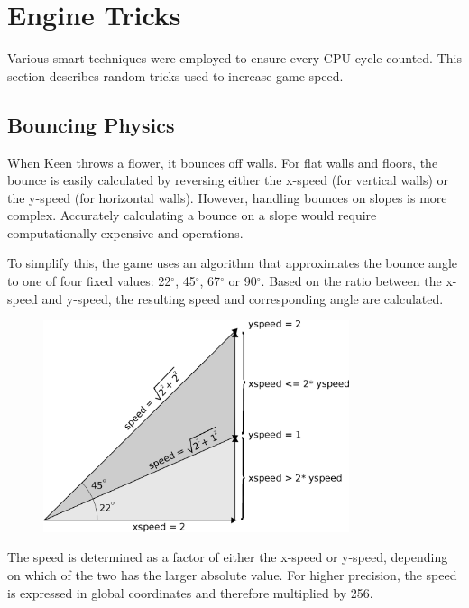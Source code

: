 \documentclass[book.tex]{subfiles}
\begin{document}
\section{Engine Tricks}
Various smart techniques were employed to ensure every CPU cycle counted. This section describes random tricks used to increase game speed.


\subsection{Bouncing Physics}
When Keen throws a flower, it bounces off walls. For flat walls and floors, the bounce is easily calculated by reversing either the x-speed (for vertical walls) or the y-speed (for horizontal walls). However, handling bounces on slopes is more complex. Accurately calculating a bounce on a slope would require computationally expensive  and  operations.\\

\par
To simplify this, the game uses an algorithm that approximates the bounce angle to one of four fixed values: 22$^{\circ}$, 45$^{\circ}$, 67$^{\circ}$ or 90$^{\circ}$. Based on the ratio between the x-speed and y-speed, the resulting speed and corresponding angle are calculated.\\

\par
\begin{figure}[H]
\centering
\includegraphics[width=0.8\textwidth]{imgs/drawings/angle_0.eps}
\label{fig:angles}
\end{figure}

\par
The speed is determined as a factor of either the x-speed or y-speed, depending on which of the two has the larger absolute value. For higher precision, the speed is expressed in global coordinates and therefore multiplied by 256.\\
\end{document}

